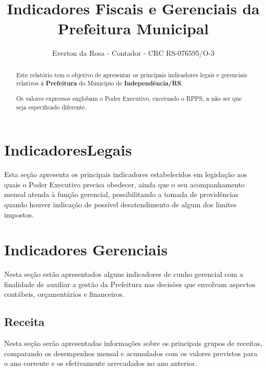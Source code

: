 \documentclass[12pt, a4paper]{report}
\title{Indicadores Fiscais e Gerenciais da Prefeitura Municipal}
\author{Everton da Rosa - Contador - CRC RS-076595/O-3}
\begin{document}
\maketitle

\begin{abstract}
Este relatório tem o objetivo de apresentar os principais indicadores legais e gerenciais relativos à \textbf{Prefeitura} do Município de \textbf{Independência/RS}.

Os valores expressos englobam o Poder Executivo, excetuado o RPPS, a não ser que seja especificado diferente.

\end{abstract}

\tableofcontents

\chapter{IndicadoresLegais}

Esta seção apresenta os principais indicadores estabelecidos em legislação aos quais o Poder Executivo precisa obedecer, ainda que o seu acompanhamento mensal atenda à função gerencial, possibilitando a tomada de providências quando houver indicação de possível desatendimento de algum dos limites impostos.










\chapter{Indicadores Gerenciais}

Nesta seção estão apresentados alguns indicadores de cunho gerencial com a finalidade de auxiliar a gestão da Prefeitura nas decisões que envolvam aspectos contábeis, orçamentários e financeiros.






\section{Receita}

Nesta seção serão apresentadas informações sobre os principais grupos de receitas, comparando os desempenhos mensal e acumulados com os valores previstos para o ano corrente e os efetivamente arrecadados no ano anterior.
\end{document}
